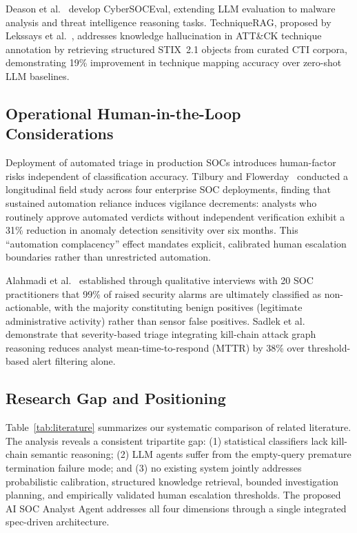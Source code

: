 Deason et al.~\cite{deason2025cybersoceval} develop CyberSOCEval, extending LLM
evaluation to malware analysis and threat intelligence reasoning tasks. TechniqueRAG,
proposed by Lekssays et al.~\cite{lekssays2025techniquerag}, addresses knowledge
hallucination in ATT\&CK technique annotation by retrieving structured STIX~2.1
objects from curated CTI corpora, demonstrating 19\% improvement in technique
mapping accuracy over zero-shot LLM baselines.

\subsection{Operational Human-in-the-Loop Considerations}

Deployment of automated triage in production SOCs introduces human-factor risks
independent of classification accuracy. Tilbury and Flowerday~\cite{tilbury2026vigilance}
conducted a longitudinal field study across four enterprise SOC deployments, finding
that sustained automation reliance induces vigilance decrements: analysts who routinely
approve automated verdicts without independent verification exhibit a 31\% reduction
in anomaly detection sensitivity over six months. This ``automation complacency''
effect mandates explicit, calibrated human escalation boundaries rather than
unrestricted automation.

Alahmadi et al.~\cite{alahmadi2022falsepositives} established through qualitative
interviews with 20 SOC practitioners that 99\% of raised security alarms are
ultimately classified as non-actionable, with the majority constituting benign
positives (legitimate administrative activity) rather than sensor false positives.
Sadlek et al.~\cite{sadlek2025killchain} demonstrate that severity-based triage
integrating kill-chain attack graph reasoning reduces analyst mean-time-to-respond
(MTTR) by 38\% over threshold-based alert filtering alone.

\subsection{Research Gap and Positioning}

Table~\ref{tab:literature} summarizes our systematic comparison of related literature.
The analysis reveals a consistent tripartite gap: (1) statistical classifiers lack
kill-chain semantic reasoning; (2) LLM agents suffer from the empty-query premature
termination failure mode; and (3) no existing system jointly addresses probabilistic
calibration, structured knowledge retrieval, bounded investigation planning, and
empirically validated human escalation thresholds. The proposed AI SOC Analyst Agent
addresses all four dimensions through a single integrated spec-driven architecture.

